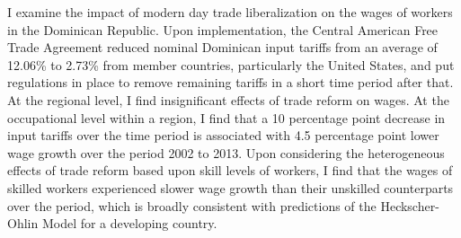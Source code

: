 I examine the impact of modern day trade liberalization on the wages of workers in the Dominican
Republic. Upon implementation, the Central American Free Trade Agreement reduced nominal Dominican input tariffs
from an average of 12.06\% to 2.73\% from member countries, particularly the United States, and 
put regulations in place to remove remaining tariffs in a short time period after that. 
At the regional level, I find insignificant effects of trade reform
on wages. At the occupational level within a region, I find that a 10 percentage point decrease in 
input tariffs over the time period is associated with 4.5 percentage point lower wage growth over the period 2002 to 2013. 
Upon considering the heterogeneous effects of trade reform based upon skill levels of workers, I find 
that the wages of skilled workers experienced slower wage growth than their unskilled counterparts over 
the period, which is broadly consistent with predictions of the Heckscher-Ohlin Model for a developing
country.